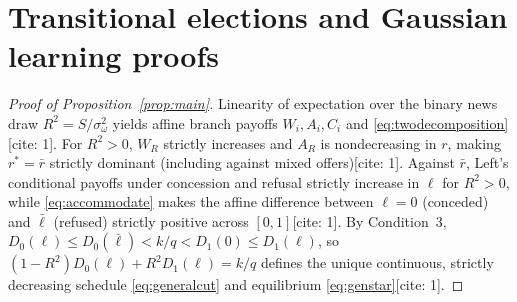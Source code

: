 \section{Transitional elections and Gaussian learning proofs}\label{app:gaussian}

\begin{proof}[Proof of Proposition~\ref{prop:main}]
Linearity of expectation over the binary news draw $R^2=S/\sigma_\omega^2$ yields affine branch payoffs $W_i,A_i,C_i$ and \eqref{eq:twodecomposition}[cite: 1]. For $R^2>0$, $W_R$ strictly increases and $A_R$ is nondecreasing in $r$, making $r^*=\bar r$ strictly dominant (including against mixed offers)[cite: 1]. Against $\bar r$, Left's conditional payoffs under concession and refusal strictly increase in $\ell$ for $R^2>0$, while \eqref{eq:accommodate} makes the affine difference between $\ell=0$ (conceded) and $\bar\ell$ (refused) strictly positive across $[0,1]$[cite: 1]. By Condition~3, $D_0(\ell)\le D_0(\bar\ell)<k/q<D_1(0)\le D_1(\ell)$, so $(1-R^2)D_0(\ell)+R^2 D_1(\ell)=k/q$ defines the unique continuous, strictly decreasing schedule \eqref{eq:generalcut} and equilibrium \eqref{eq:genstar}[cite: 1].
\end{proof}

